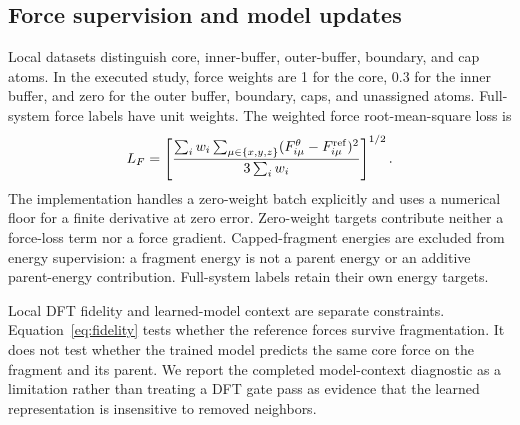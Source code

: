 \subsection{Force supervision and model updates}
Local datasets distinguish core, inner-buffer, outer-buffer, boundary,
and cap atoms. In the executed study, force weights are 1 for the core,
0.3 for the inner buffer, and zero for the outer buffer, boundary,
caps, and unassigned atoms. Full-system force labels have unit weights.
The weighted force root-mean-square loss is
\begin{equation}
 L_F=\left[
 \frac{\sum_i w_i\sum_{\mu\in\{x,y,z\}}
 (F_{i\mu}^{\theta}-F_{i\mu}^{\rm ref})^2}
 {3\sum_i w_i}\right]^{1/2}.
 \label{eq:loss}
\end{equation}
The implementation handles a zero-weight batch explicitly and uses a
numerical floor for a finite derivative at zero error. Zero-weight targets
contribute neither a force-loss term nor a force gradient.
Capped-fragment energies are excluded from energy supervision: a fragment
energy is not a parent energy or an additive parent-energy contribution.
Full-system labels retain their own energy targets.

Local DFT fidelity and learned-model context are separate constraints.
Equation~\eqref{eq:fidelity} tests whether the reference forces survive
fragmentation. It does not test whether the trained model predicts the
same core force on the fragment and its parent. We report the completed
model-context diagnostic as a limitation rather than treating a DFT gate
pass as evidence that the learned representation is insensitive to
removed neighbors.
